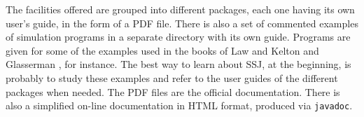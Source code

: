 \documentclass[12pt]{article}
\begin{document}
The facilities offered are grouped into different packages, 
each one having its own user's guide, in the form of a PDF file.
There is also a set of commented examples of simulation programs
in a separate directory with its own guide.
Programs are given for some of the examples used in the books of 
Law and Kelton \cite{sLAW00a} and Glasserman \cite{fGLA04a}, for instance.
The best way to learn about SSJ, at the beginning, is probably
to study these examples and refer to the user guides of the different
packages when needed.
The PDF files are the official documentation.
There is also a simplified on-line documentation in HTML 
format, produced via \texttt{javadoc}.





\begin{comment}


\subsection*{random number generation}


\end{comment}
\end{document}
